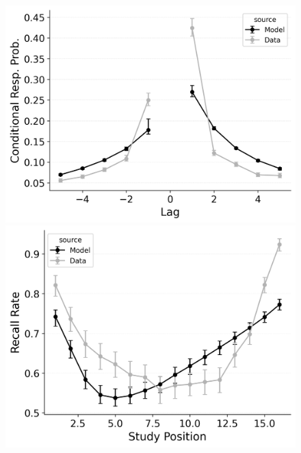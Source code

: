 \documentclass[
  man,
  floatsintext,
  longtable,
  nolmodern,
  notxfonts,
  notimes,
  draftfirst,
  colorlinks=true,linkcolor=blue,citecolor=blue,urlcolor=blue]{apa7}
\begin{document}
\begin{figure}
\begin{minipage}{0.33\linewidth}
\includegraphics{figures/bw_HealeyKahana2014_CRU_with_Feature-to-Context__Primacy__and_StartDrift_Fitting_crp.png}\end{minipage}%
%
\begin{minipage}{0.33\linewidth}
\includegraphics{figures/bw_HealeyKahana2014_CRU_with_Feature-to-Context__Primacy__and_StartDrift_Fitting_spc.png}\end{minipage}%
\newline
\begin{minipage}{0.33\linewidth}

\end{minipage}
\end{figure}
\end{document}
